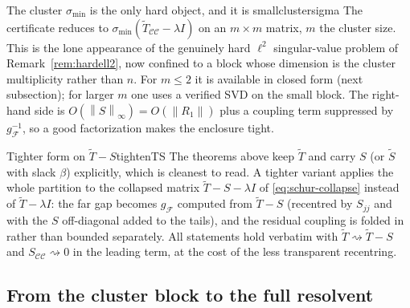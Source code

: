 \documentclass[11pt, a4paper]{article}
\numberwithin{equation}{section}
\newcommand{\norm}[1]{\left\|#1\right\|}
\newcommand{\tT}{\widetilde{T}}
\begin{document}
\begin{remark}{The cluster $\sigma_{\min}$ is the only hard object, and it is small}{clustersigma}
  The certificate reduces to $\sigma_{\min}(\tT_{\mathcal{C}\mathcal{C}}
  - \lambda I)$ on an $m\times m$ matrix, $m$ the cluster size.  This is the lone
  appearance of the genuinely hard $\ell^2$ singular-value problem of
  Remark~\ref{rem:hardell2}, now confined to a block whose dimension is the
  cluster multiplicity rather than $n$.  For $m \le 2$ it is available in closed
  form (next subsection); for larger $m$ one uses a verified SVD on the small
  block.  The right-hand side is $O(\norm{S}_\infty) = O(\norm{R_1})$ plus a
  coupling term suppressed by $g_{\mathcal{F}}^{-1}$, so a good factorization
  makes the enclosure tight.
\end{remark}

\begin{remark}{Tighter form on $\tT - S$}{tightenTS}
  The theorems above keep $\tT$ and carry $S$ (or $\tilde S$ with slack
  $\beta$) explicitly, which is cleanest to read.  A tighter variant applies the
  whole partition to the collapsed matrix $\tT - S - \lambda I$ of
  \eqref{eq:schur-collapse} instead of $\tT - \lambda I$: the far gap becomes
  $g_{\mathcal{F}}$ computed from $\tT - S$ (recentred by $S_{jj}$ and with the
  $S$ off-diagonal added to the tails), and the residual coupling is folded in
  rather than bounded separately.  All statements hold verbatim with $\tT
  \rightsquigarrow \tT - S$ and $S_{\mathcal{C}\mathcal{C}} \rightsquigarrow 0$
  in the leading term, at the cost of the less transparent recentring.
\end{remark}

\subsection{From the cluster block to the full resolvent}
\end{document}
